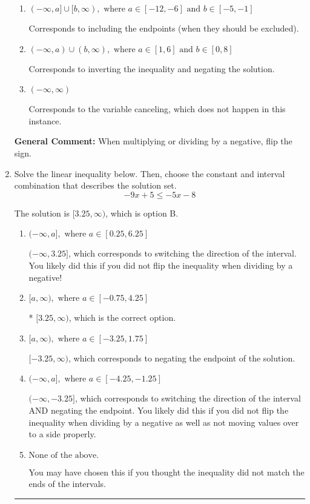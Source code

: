 \documentclass{extbook}[14pt]
\newcommand{\litem}[1]{\item #1

\rule{\textwidth}{0.4pt}}
\begin{document}
\begin{enumerate}
{\begin{enumerate}[label=\Alph*.]
Corresponds to including the endpoints AND negating.
\item \( (-\infty, a] \cup [b, \infty), \text{ where } a \in [-12, -6] \text{ and } b \in [-5, -1] \)

Corresponds to including the endpoints (when they should be excluded).
\item \( (-\infty, a) \cup (b, \infty), \text{ where } a \in [1, 6] \text{ and } b \in [0, 8] \)

Corresponds to inverting the inequality and negating the solution.
\item \( (-\infty, \infty) \)

Corresponds to the variable canceling, which does not happen in this instance.
\end{enumerate}

\textbf{General Comment:} When multiplying or dividing by a negative, flip the sign.
}
\litem{
Solve the linear inequality below. Then, choose the constant and interval combination that describes the solution set.
\[ -9x + 5 \leq -5x -8 \]

The solution is \( [3.25, \infty) \), which is option B.\begin{enumerate}[label=\Alph*.]
\item \( (-\infty, a], \text{ where } a \in [0.25, 6.25] \)

 $(-\infty, 3.25]$, which corresponds to switching the direction of the interval. You likely did this if you did not flip the inequality when dividing by a negative!
\item \( [a, \infty), \text{ where } a \in [-0.75, 4.25] \)

* $[3.25, \infty)$, which is the correct option.
\item \( [a, \infty), \text{ where } a \in [-3.25, 1.75] \)

 $[-3.25, \infty)$, which corresponds to negating the endpoint of the solution.
\item \( (-\infty, a], \text{ where } a \in [-4.25, -1.25] \)

 $(-\infty, -3.25]$, which corresponds to switching the direction of the interval AND negating the endpoint. You likely did this if you did not flip the inequality when dividing by a negative as well as not moving values over to a side properly.
\item \( \text{None of the above}. \)

You may have chosen this if you thought the inequality did not match the ends of the intervals.
\end{enumerate}

}
\end{enumerate}
\end{document}
